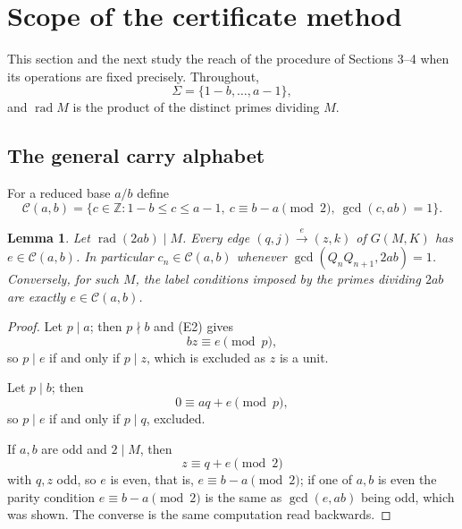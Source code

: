 \documentclass[11pt,reqno]{amsart}
\newtheorem{lemma}[theorem]{Lemma}
\theoremstyle{definition}
\theoremstyle{remark}
\begin{document}
\section{Scope of the certificate method}\label{sec:7}

This section and the next study the reach of the procedure of
Sections 3--4 when its operations are fixed precisely. Throughout,
\[
\Sigma=\{1-b,\ldots,a-1\},
\]
and \(\operatorname{rad}M\) is the product
of the distinct primes dividing \(M\).

\subsection{The general carry alphabet}\label{sec:7.1}

For a reduced base \(a/b\) define
\[
\mathcal C(a,b)=\{c\in\mathbb Z:1-b\le c\le a-1,\ c\equiv b-a\pmod2,\
\gcd(c,ab)=1\}.
\tag{26}\label{eq:26}
\]

\begin{samepage}
\begin{lemma}\leavevmode\label{thm:29}
Let \(\operatorname{rad}(2ab)\mid M\). Every edge
\((q,j)\xrightarrow{e}(z,k)\) of \(G(M,K)\) has \(e\in\mathcal C(a,b)\).
In particular \(c_n\in\mathcal C(a,b)\) whenever
\(\gcd(Q_nQ_{n+1},2ab)=1\). Conversely, for such \(M\), the label
conditions imposed by the primes dividing \(2ab\) are exactly
\(e\in\mathcal C(a,b)\).
\label{thm-end:29}
\end{lemma}
\end{samepage}

\begin{proof}\leavevmode\label{proof:29}
Let \(p\mid a\); then \(p\nmid b\) and (E2) gives
\[
bz\equiv e\pmod p,
\]
so \(p\mid e\) if and only if \(p\mid z\), which
is excluded as \(z\) is a unit.

Let \(p\mid b\); then
\[
0\equiv aq+e\pmod p,
\]
so \(p\mid e\) if and only if \(p\mid q\),
excluded.

If \(a,b\) are odd and \(2\mid M\), then
\[
z\equiv q+e\pmod2
\]
with \(q,z\) odd, so \(e\) is even, that is, \(e\equiv b-a\pmod2\); if
one of \(a,b\) is even the parity condition \(e\equiv b-a\pmod2\) is
the same as \(\gcd(e,ab)\) being odd, which was shown. The converse is
the same computation read backwards. \qedhere
\end{proof}
\end{document}
